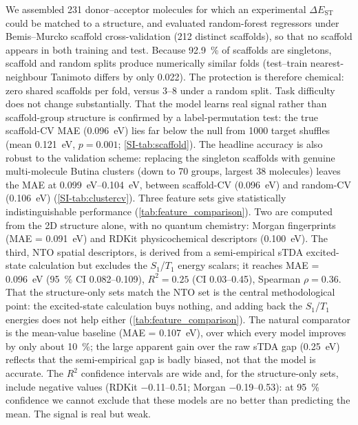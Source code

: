 We assembled \num{231} donor--acceptor molecules for which an experimental
$\Delta E_\text{ST}$ could be matched to a structure, and evaluated random-forest
regressors under Bemis--Murcko scaffold cross-validation (\num{212} distinct
scaffolds), so that no scaffold appears in both training and test.
Because \qty{92.9}{\percent} of scaffolds are singletons, scaffold and random splits
produce numerically similar folds (test--train nearest-neighbour Tanimoto differs by
only \num{0.022}). The protection is therefore chemical: zero shared scaffolds per
fold, versus \numrange{3}{8} under a random split. Task difficulty does not change
substantially. That the model learns real signal rather than
scaffold-group structure is confirmed by a label-permutation test: the true
scaffold-CV MAE (\qty{0.096}{\electronvolt}) lies far below the null from
\num{1000} target shuffles (mean \qty{0.121}{\electronvolt}, $p = 0.001$;
\cref{SI-tab:scaffold}).
The headline accuracy is also robust to the validation scheme: replacing the singleton
scaffolds with genuine multi-molecule Butina clusters (down to \num{70} groups, largest
\num{38} molecules) leaves the MAE at \qtyrange{0.099}{0.104}{\electronvolt}, between
scaffold-CV (\qty{0.096}{\electronvolt}) and random-CV (\qty{0.106}{\electronvolt})
(\cref{SI-tab:clustercv}).
Three feature sets give statistically indistinguishable performance
(\cref{tab:feature_comparison}). Two are computed from the 2D structure alone, with
no quantum chemistry: Morgan fingerprints (MAE = \qty{0.091}{\electronvolt}) and
RDKit physicochemical descriptors (\qty{0.100}{\electronvolt}). The third, NTO spatial
descriptors, is derived from a semi-empirical sTDA excited-state calculation but
excludes the $S_1$/$T_1$ energy scalars; it reaches MAE = \qty{0.096}{\electronvolt}
(\qty{95}{\percent} CI \numrange{0.082}{0.109}), $R^2 = 0.25$ (CI
\numrange{0.03}{0.45}), Spearman $\rho = 0.36$.
That the structure-only sets match the NTO set is the central methodological point:
the excited-state calculation buys nothing, and adding back the $S_1$/$T_1$ energies
does not help either (\cref{tab:feature_comparison}).
The natural comparator is the mean-value baseline (MAE = \qty{0.107}{\electronvolt}),
over which every model improves by only about \qty{10}{\percent}; the large apparent
gain over the raw sTDA gap (\qty{0.25}{\electronvolt}) reflects that the semi-empirical
gap is badly biased, not that the model is accurate.
The $R^2$ confidence intervals are wide and, for the structure-only sets, include
negative values (RDKit \numrange{-0.11}{0.51}; Morgan \numrange{-0.19}{0.53}): at
\qty{95}{\percent} confidence we cannot exclude that these models are no better than
predicting the mean. The signal is real but weak.

